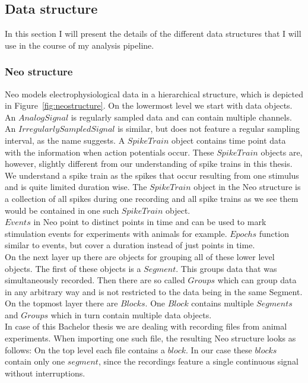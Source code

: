 \subsection{Data structure}
In this section I will present the details of the different data structures that I will use in the course of my analysis pipeline.

\subsubsection{Neo structure}
Neo models electrophysiological data in a hierarchical structure, which is depicted in Figure~\ref{fig:neostructure}. On the lowermost level we start with data objects. An $AnalogSignal$ is regularly sampled data and can contain multiple channels. An $IrregularlySampledSignal$ is similar, but does not feature a regular sampling interval, as the name suggests. A $SpikeTrain$ object contains time point data with the information when action potentials occur. These $SpikeTrain$ objects are, however, slightly different from our understanding of spike trains in this thesis. We understand a spike train as the spikes that occur resulting from one stimulus and is quite limited duration wise. The $SpikeTrain$ object in the Neo structure is a collection of all spikes during one recording and all spike trains as we see them would be contained in one such $SpikeTrain$ object.\\
$Events$ in Neo point to distinct points in time and can be used to mark stimulation events for experiments with animals for example. $Epochs$ function similar to events, but cover a duration instead of just points in time.\\
On the next layer up there are objects for grouping all of these lower level objects. The first of these objects is a $Segment$. This groups data that was simultaneously recorded. Then there are so called $Groups$ which can group data in any arbitrary way and is not restricted to the data being  in the same Segment. On the topmost layer there are $Blocks$. One $Block$ contains multiple $Segments$ and $Groups$ which in turn contain multiple data objects.\\

In case of this Bachelor thesis we are dealing with recording files from animal experiments. When importing one such file, the resulting Neo structure looks as follows: On the top level each file contains a $block$. In our case these $blocks$ contain only one $segment$, since the recordings feature a single continuous signal without interruptions.

